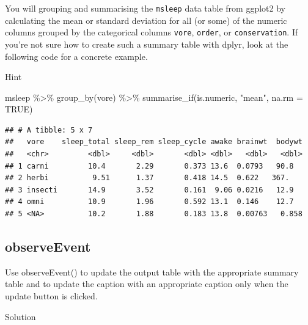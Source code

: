\documentclass[
]{book}
\newenvironment{Shaded}{\begin{snugshade}}{\end{snugshade}}
\newcommand{\AttributeTok}[1]{\textcolor[rgb]{0.77,0.63,0.00}{#1}}
\newcommand{\ConstantTok}[1]{\textcolor[rgb]{0.00,0.00,0.00}{#1}}
\newcommand{\FunctionTok}[1]{\textcolor[rgb]{0.00,0.00,0.00}{#1}}
\newcommand{\NormalTok}[1]{#1}
\newcommand{\SpecialCharTok}[1]{\textcolor[rgb]{0.00,0.00,0.00}{#1}}
\newcommand{\StringTok}[1]{\textcolor[rgb]{0.31,0.60,0.02}{#1}}
\begin{document}
You will grouping and summarising the \texttt{msleep} data table from ggplot2 by calculating the mean or standard deviation for all (or some) of the numeric columns grouped by the categorical columns \texttt{vore}, \texttt{order}, or \texttt{conservation}. If you're not sure how to create such a summary table with dplyr, look at the following code for a concrete example.

Hint

\begin{Shaded}
\begin{Highlighting}[]
\NormalTok{msleep }\SpecialCharTok{\%\textgreater{}\%}
  \FunctionTok{group\_by}\NormalTok{(vore) }\SpecialCharTok{\%\textgreater{}\%}
  \FunctionTok{summarise\_if}\NormalTok{(is.numeric, }\StringTok{"mean"}\NormalTok{, }\AttributeTok{na.rm =} \ConstantTok{TRUE}\NormalTok{)}
\end{Highlighting}
\end{Shaded}

\begin{verbatim}
## # A tibble: 5 x 7
##   vore    sleep_total sleep_rem sleep_cycle awake brainwt  bodywt
##   <chr>         <dbl>     <dbl>       <dbl> <dbl>   <dbl>   <dbl>
## 1 carni         10.4       2.29       0.373 13.6  0.0793   90.8  
## 2 herbi          9.51      1.37       0.418 14.5  0.622   367.   
## 3 insecti       14.9       3.52       0.161  9.06 0.0216   12.9  
## 4 omni          10.9       1.96       0.592 13.1  0.146    12.7  
## 5 <NA>          10.2       1.88       0.183 13.8  0.00763   0.858
\end{verbatim}

\hypertarget{observeevent-2}{%
\subsection{observeEvent}\label{observeevent-2}}

Use observeEvent() to update the output table with the appropriate summary table and to update the caption with an appropriate caption only when the update button is clicked.

Solution
\end{document}
